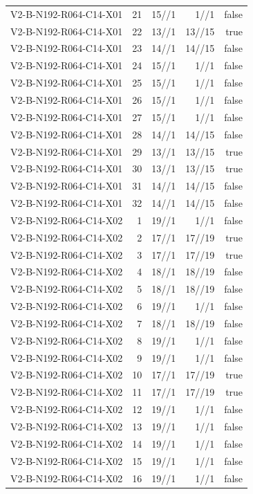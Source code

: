 {\begin{longtable}{lrrrr}
V2-B-N192-R064-C14-X01 & 21 & 15//1 & 1//1 & false \\
V2-B-N192-R064-C14-X01 & 22 & 13//1 & 13//15 & true \\
V2-B-N192-R064-C14-X01 & 23 & 14//1 & 14//15 & false \\
V2-B-N192-R064-C14-X01 & 24 & 15//1 & 1//1 & false \\
V2-B-N192-R064-C14-X01 & 25 & 15//1 & 1//1 & false \\
V2-B-N192-R064-C14-X01 & 26 & 15//1 & 1//1 & false \\
V2-B-N192-R064-C14-X01 & 27 & 15//1 & 1//1 & false \\
V2-B-N192-R064-C14-X01 & 28 & 14//1 & 14//15 & false \\
V2-B-N192-R064-C14-X01 & 29 & 13//1 & 13//15 & true \\
V2-B-N192-R064-C14-X01 & 30 & 13//1 & 13//15 & true \\
V2-B-N192-R064-C14-X01 & 31 & 14//1 & 14//15 & false \\
V2-B-N192-R064-C14-X01 & 32 & 14//1 & 14//15 & false \\
V2-B-N192-R064-C14-X02 & 1 & 19//1 & 1//1 & false \\
V2-B-N192-R064-C14-X02 & 2 & 17//1 & 17//19 & true \\
V2-B-N192-R064-C14-X02 & 3 & 17//1 & 17//19 & true \\
V2-B-N192-R064-C14-X02 & 4 & 18//1 & 18//19 & false \\
V2-B-N192-R064-C14-X02 & 5 & 18//1 & 18//19 & false \\
V2-B-N192-R064-C14-X02 & 6 & 19//1 & 1//1 & false \\
V2-B-N192-R064-C14-X02 & 7 & 18//1 & 18//19 & false \\
V2-B-N192-R064-C14-X02 & 8 & 19//1 & 1//1 & false \\
V2-B-N192-R064-C14-X02 & 9 & 19//1 & 1//1 & false \\
V2-B-N192-R064-C14-X02 & 10 & 17//1 & 17//19 & true \\
V2-B-N192-R064-C14-X02 & 11 & 17//1 & 17//19 & true \\
V2-B-N192-R064-C14-X02 & 12 & 19//1 & 1//1 & false \\
V2-B-N192-R064-C14-X02 & 13 & 19//1 & 1//1 & false \\
V2-B-N192-R064-C14-X02 & 14 & 19//1 & 1//1 & false \\
V2-B-N192-R064-C14-X02 & 15 & 19//1 & 1//1 & false \\
V2-B-N192-R064-C14-X02 & 16 & 19//1 & 1//1 & false \\

\end{longtable}}
